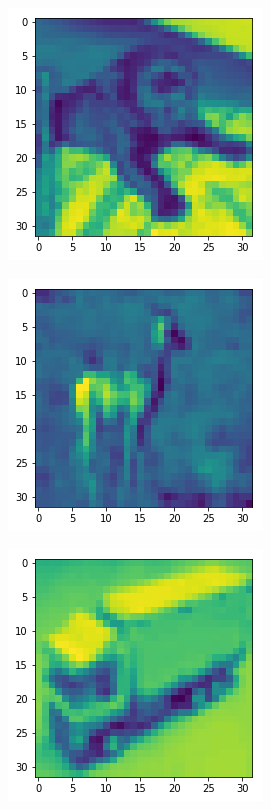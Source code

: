 \begin{figure}[H]
\begin{subfigure}{.3\linewidth}
\end{subfigure}
\begin{subfigure}{.3\linewidth}
 \centering
 \includegraphics[scale=0.4]{chapter_3_figures/cifar_chimp.png}
\end{subfigure}
 \hfill
\begin{subfigure}{.3\linewidth}
 \centering
 \includegraphics[scale=0.4]{chapter_3_figures/cifar_gazelle.png}
\end{subfigure}
 \hfill
\begin{subfigure}{.3\linewidth}
 \centering
 \includegraphics[scale=0.4]{chapter_3_figures/cifar_lorry.png}
\end{subfigure}


\end{figure}
